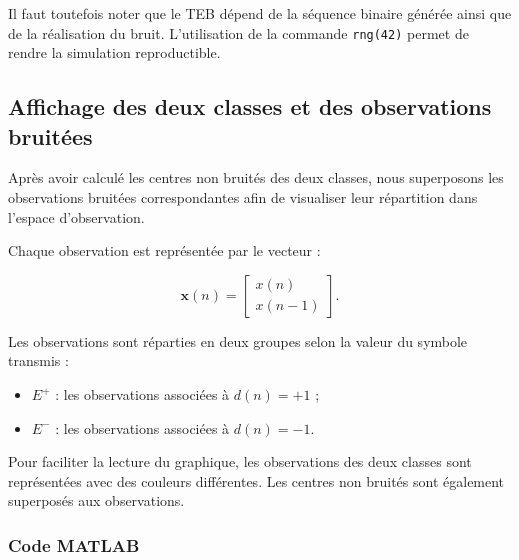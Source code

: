 Il faut toutefois noter que le TEB dépend de la séquence
binaire générée ainsi que de la réalisation du bruit.
L'utilisation de la commande \texttt{rng(42)} permet
de rendre la simulation reproductible.

\subsection{Affichage des deux classes et des observations bruitées}

Après avoir calculé les centres non bruités des deux
classes, nous superposons les observations bruitées
correspondantes afin de visualiser leur répartition
dans l'espace d'observation.

Chaque observation est représentée par le vecteur :

\begin{equation}
\mathbf{x}(n)=
\begin{bmatrix}
x(n)\\
x(n-1)
\end{bmatrix}.
\end{equation}

Les observations sont réparties en deux groupes selon
la valeur du symbole transmis :

\begin{itemize}
    \item $E^+$ : les observations associées à $d(n)=+1$ ;
    \item $E^-$ : les observations associées à $d(n)=-1$.
\end{itemize}

Pour faciliter la lecture du graphique, les observations
des deux classes sont représentées avec des couleurs
différentes. Les centres non bruités sont également
superposés aux observations.

\subsubsection{Code MATLAB}

